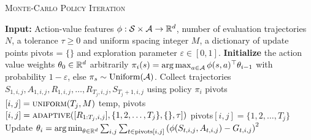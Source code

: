        \begin{algorithm}[t]
            \caption{\textsc{Monte-Carlo Policy Iteration}}\label{alg:mc}
            \begin{algorithmic}
            \State \textbf{Input:} Action-value features $\phi: \mathcal{S} \times \mathcal{A} \rightarrow \mathbb{R}^d$, number of evaluation trajectories $N$, a tolerance $\tau \geq 0$ and uniform spacing integer $M$, a dictionary of update points pivots = $\{\}$ and exploration parameter $\varepsilon \in [0,1]$.
            \State \textbf{Initialize} the action value weights $\theta_0 \in \mathbb{R}^d$ arbitrarily
                \State $\pi_i(s) = \mathop{\rm arg\,max}_{a \in \mathcal{A}} \phi(s,a)^\top \theta_{i-1}$ with probability $1-\varepsilon$, else $\pi_s \sim \text{Uniform}(\mathcal{A})$.
                    \State Collect trajectories $S_{1,i,j},A_{1,i,j},R_{1,i,j},\dotsc,R_{T_j,i,j},S_{T_j+1,i,j}$ using policy $\pi_i$
                    \State pivots$[i,j] = \textsc{uniform}(T_j, M)$
                    \State temp, pivots$[i,j] = \textsc{adaptive}([R_{1:T_j,i,j}], \{1,2,\dotsc,T_j\},\{\}, \tau])$
                    \Else
                    \State pivots$[i,j]=\{1,2,\dotsc,T_j\}$
                    \EndIf
                \EndFor
                \State Update $\theta_i = \mathop{\rm arg\,min}_{\theta \in \mathbb{R}^d} \sum_{i,j}\sum_{t\in\text{pivots}[i,j]} \left(\phi(S_{t,i,j},A_{t,i,j}) - G_{t,i,j}\right)^2$
            \EndFor
            \end{algorithmic}
            \end{algorithm}
